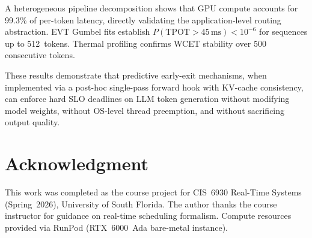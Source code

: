 \documentclass[conference]{IEEEtran}
\begin{document}
A heterogeneous pipeline decomposition shows that GPU compute accounts
for 99.3\% of per-token latency, directly validating the
application-level routing abstraction.
EVT Gumbel fits establish $P(\text{TPOT}>45\,\text{ms})<10^{-6}$
for sequences up to 512~tokens.
Thermal profiling confirms WCET stability over 500 consecutive tokens.

These results demonstrate that predictive early-exit mechanisms,
when implemented via a post-hoc single-pass forward hook with KV-cache
consistency, can enforce hard SLO deadlines on LLM token generation
without modifying model weights, without OS-level thread preemption,
and without sacrificing output quality.

\section*{Acknowledgment}

This work was completed as the course project for CIS~6930 Real-Time
Systems (Spring~2026), University of South Florida.
The author thanks the course instructor for guidance on real-time
scheduling formalism.
Compute resources provided via RunPod (RTX~6000~Ada bare-metal instance).



\end{document}
